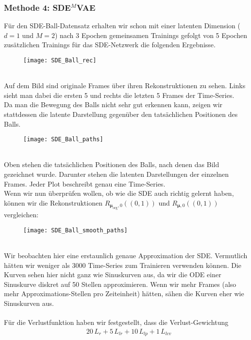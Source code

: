 \documentclass[12pt]{article}
\newcommand{\bmu}{\bm{\mu}}
\begin{document}
	\subsubsection{Methode 4: SDE$^M$VAE}
	Für den SDE-Ball-Datensatz erhalten wir schon mit einer latenten Dimension ($d=1$ und $M=2$) nach 3 Epochen gemeinsamen Trainings gefolgt von 5 Epochen zusätzlichen Trainings für das SDE-Netzwerk die folgenden Ergebnisse.\\
	\begin{figure}[!htbp]
		\centering
		\texttt{[image: SDE\_Ball\_rec]}
	\end{figure}
	\\
	Auf dem Bild sind originale Frames über ihren Rekonstruktionen zu sehen. Links sieht man dabei die ersten 5 und rechts die letzten 5 Frames der Time-Series.\\
	Da man die Bewegung des Balls nicht sehr gut erkennen kann, zeigen wir stattdessen die latente Darstellung gegenüber den tatsächlichen Positionen des Balls.\\
	\begin{figure}[!htbp]
		\centering
		\texttt{[image: SDE\_Ball\_paths]}
	\end{figure}
	\\
	Oben stehen die tatsächlichen Positionen des Balls, nach denen das Bild gezeichnet wurde. Darunter stehen die latenten Darstellungen der einzelnen Frames. Jeder Plot beschreibt genau eine Time-Series.\\
	Wenn wir nun überprüfen wollen, ob wie die SDE auch richtig gelernt haben, können wir die Rekonstruktionen $R_{\bmu_{\text{org}},0}((0,1))$ und $R_{\bmu,0}((0,1))$ vergleichen:\\
	\begin{figure}[!htbp]
		\centering
		\texttt{[image: SDE\_Ball\_smooth\_paths]}
	\end{figure}
	\\
	Wir beobachten hier eine erstaunlich genaue Approximation der SDE. Vermutlich hätten wir weniger als 3000 Time-Series zum Trainieren verwenden können. Die Kurven sehen hier nicht ganz wie Sinuskurven aus, da wir die ODE einer Sinuskurve diskret auf 50 Stellen approximieren. Wenn wir mehr Frames (also mehr Approximations-Stellen pro Zeiteinheit) hätten, sähen die Kurven eher wie Sinuskurven aus.\\
	\\
	Für die Verlustfunktion haben wir festgestellt, dass die Verlust-Gewichtung
	\begin{align*}
	& 20 \, L_r + 5 \, L_{lr} + 10 \, L_{lp} + 1 \, L_{lcv}
	\end{align*}
\end{document}
